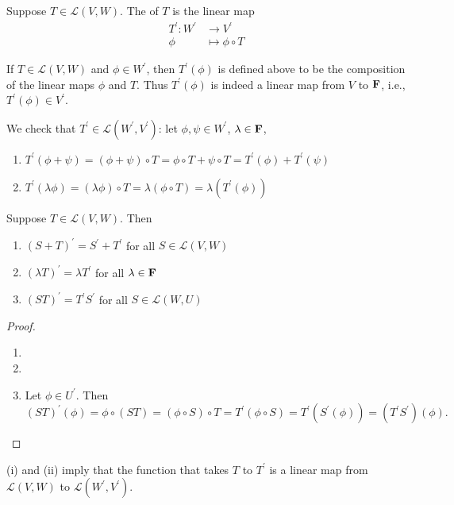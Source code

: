 \begin{definition}
Suppose $T\in\mathcal{L}(V,W)$. The  of $T$ is the linear map
\begin{align*}
T^\prime:W^\prime&\to V^\prime\\
\phi&\mapsto\phi\circ T
\end{align*}
\end{definition}

If $T\in\mathcal{L}(V,W)$ and $\phi\in W^\prime$, then $T^\prime(\phi)$ is defined above to be the composition of the linear maps $\phi$ and $T$. Thus $T^\prime(\phi)$ is indeed a linear map from $V$ to $\mathbf F$, i.e., $T^\prime(\phi)\in V^\prime$.

We check that $T^\prime\in\mathcal{L}(W^\prime,V^\prime)$: let $\phi,\psi\in W^\prime$, $\lambda\in\mathbf F$,
\begin{enumerate}[label=(\roman*)]
\item $T^\prime(\phi+\psi)=(\phi+\psi)\circ T=\phi\circ T+\psi\circ T=T^\prime(\phi)+T^\prime(\psi)$
\item $T^\prime(\lambda\phi)=(\lambda\phi)\circ T=\lambda(\phi\circ T)=\lambda(T^\prime(\phi))$
\end{enumerate}

\begin{lemma}
Suppose $T\in\mathcal{L}(V,W)$. Then
\begin{enumerate}[label=(\roman*)]
\item $(S+T)^\prime=S^\prime+T^\prime$ for all $S\in\mathcal{L}(V,W)$
\item $(\lambda T)^\prime=\lambda T^\prime$ for all $\lambda\in\mathbf F$
\item $(ST)^\prime=T^\prime S^\prime$ for all $S\in\mathcal{L}(W,U)$
\end{enumerate}
\end{lemma}

\begin{proof} \
\begin{enumerate}[label=(\roman*)]
\item 
\item 
\item Let $\phi\in U^\prime$. Then
\[(ST)^\prime(\phi)=\phi\circ(ST)=(\phi\circ S)\circ T=T^\prime(\phi\circ S)=T^\prime(S^\prime(\phi))=(T^\prime S^\prime)(\phi).\]
\end{enumerate}
\end{proof}

(i) and (ii) imply that the function that takes $T$ to $T^\prime$ is a linear map from $\mathcal{L}(V,W)$ to $\mathcal{L}(W^\prime,V^\prime)$.
\pagebreak

